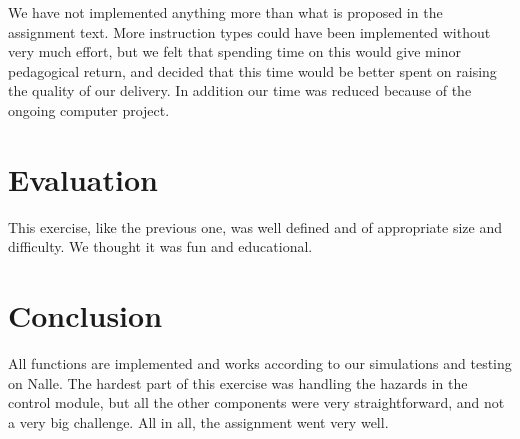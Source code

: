 \documentclass[11pt]{report}
\begin{document}
We have not implemented anything more than what is proposed in the assignment
text. More instruction types could have been implemented without very much effort,
but we felt that spending time on this would give minor pedagogical return, 
and decided that this time would be better spent on raising the quality of our
delivery. In addition our time was reduced because of the ongoing computer
project.


\section*{Evaluation}


This exercise, like the previous one, was well defined and of appropriate
size and difficulty. We thought it was fun and educational.

\section*{Conclusion}


All functions are implemented and works according to our simulations
and testing on Nalle.
The hardest part of this exercise was handling the hazards in the control
module, but all the other components were very straightforward, and
not a very big challenge. All in all, the assignment went very well.
\end{document}
